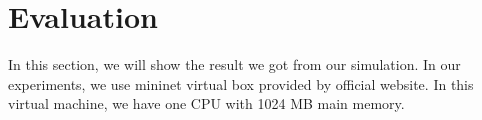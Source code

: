 \section{Evaluation} \label{sec:evaluation}

In this section, we will show the result we got from our simulation.
In our experiments, we use mininet virtual box provided by official website. 
In this virtual machine, we have one CPU with 1024 MB main memory.